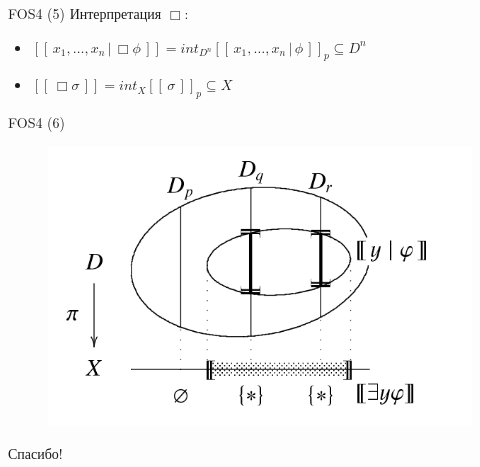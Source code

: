 \documentclass{beamer}
\begin{document}
\begin{frame}{FOS4 (5)}
Интерпретация $\Box$:\\
\bigskip
{\small
	\begin{itemize}
		\item $[ \! [ \, x_1, \ldots, x_n \, \vert \, \Box \phi \, ] \! ] = int_{D^n} [ \! [ \, x_1, \ldots, x_n \, \vert \, \phi \, ] \! ]_p \subseteq D^n$\\ \medskip
		\item $[ \! [ \, \Box \sigma \, ] \! ] = int_{X} [ \! [ \, \sigma \, ] \! ]_p \subseteq X$
	\end{itemize}
}
\end{frame}


\begin{frame}{FOS4 (6)}
\begin{center}
	\begin{figure}[H]
		\includegraphics[scale=0.4]{fos4_2.png} 
	\end{figure}
\end{center}
\end{frame}




\begin{frame}{}
    \thispagestyle{empty}
    \begin{center}
        {\large Спасибо!}
    \end{center}
\end{frame}


\end{document}
